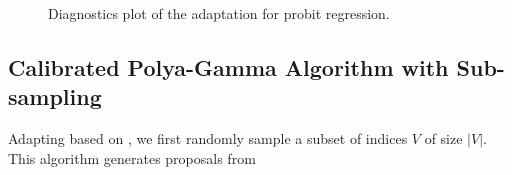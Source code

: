 \documentclass[11pt]{article}
\begin{document}
\begin{figure}[H]
  {\caption { Diagnostics plot of the adaptation for probit regression. \label{probitAdaptDiag}}}
  {%
    \qquad
  }
\end{figure}
{
\subsection{Calibrated  Polya-Gamma Algorithm with Sub-sampling}
}
Adapting based on \cite{johndrow2015approximations}, we first randomly sample
a subset of indices $V$ of size $|V|$. This algorithm  generates proposals from
\end{document}
